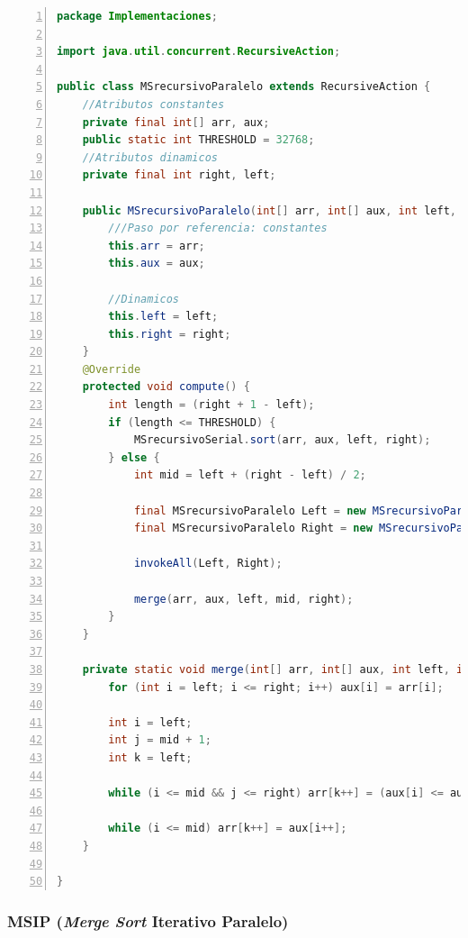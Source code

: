 \documentclass[titlepage]{article}
\begin{document}
	\begin{lstlisting}[language=java, frame=single, numbers=left, float=h]
package Implementaciones;

import java.util.concurrent.RecursiveAction;

public class MSrecursivoParalelo extends RecursiveAction {
	//Atributos constantes
	private final int[] arr, aux;
	public static int THRESHOLD = 32768;
	//Atributos dinamicos
	private final int right, left;
	
	public MSrecursivoParalelo(int[] arr, int[] aux, int left, int right){
		///Paso por referencia: constantes
		this.arr = arr;
		this.aux = aux;
		
		//Dinamicos
		this.left = left;
		this.right = right;
	}
	@Override
	protected void compute() {
		int length = (right + 1 - left);
		if (length <= THRESHOLD) {
			MSrecursivoSerial.sort(arr, aux, left, right);
		} else {
			int mid = left + (right - left) / 2;
			
			final MSrecursivoParalelo Left = new MSrecursivoParalelo(arr, aux, left, mid);
			final MSrecursivoParalelo Right = new MSrecursivoParalelo(arr, aux, mid+1, right);
			
			invokeAll(Left, Right);
			
			merge(arr, aux, left, mid, right);
		}
	}
	
	private static void merge(int[] arr, int[] aux, int left, int mid, int right) {
		for (int i = left; i <= right; i++) aux[i] = arr[i];
		
		int i = left;       
		int j = mid + 1;    
		int k = left;       
		
		while (i <= mid && j <= right) arr[k++] = (aux[i] <= aux[j])? aux[i++] : aux[j++];
		
		while (i <= mid) arr[k++] = aux[i++];
	}
	
}
	\end{lstlisting}


\newpage
\subsubsection*{MSIP (\textit{Merge Sort} Iterativo Paralelo)}
\end{document}
